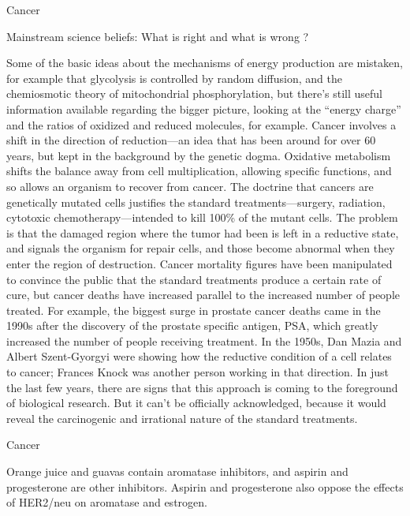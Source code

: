 \documentclass[11pt,oneside,openany,extrafontsizes]{memoir}
\begin{document}
\begin{qaexchange}{Cancer}

    \begin{question}
        Mainstream science beliefs: What is right and what is wrong ?
    \end{question}

    \begin{answer}
        Some of the basic ideas about the mechanisms of energy production are mistaken, for example that glycolysis is controlled by random diffusion, and the chemiosmotic theory of mitochondrial phosphorylation, but there's still useful information available regarding the bigger picture, looking at the \enquote{energy charge} and the ratios of oxidized and reduced molecules, for example. Cancer involves a shift in the direction of reduction---an idea that has been around for over 60 years, but kept in the background by the genetic dogma. Oxidative metabolism shifts the balance away from cell multiplication, allowing specific functions, and so allows an organism to recover from cancer. The doctrine that cancers are genetically mutated cells justifies the standard treatments---surgery, radiation, cytotoxic chemotherapy---intended to kill 100\% of the mutant cells. The problem is that the damaged region where the tumor had been is left in a reductive state, and signals the organism for repair cells, and those become abnormal when they enter the region of destruction. Cancer mortality figures have been manipulated to convince the public that the standard treatments produce a certain rate of cure, but cancer deaths have increased parallel to the increased number of people treated. For example, the biggest surge in prostate cancer deaths came in the 1990s after the discovery of the prostate specific antigen, PSA, which greatly increased the number of people receiving treatment. In the 1950s, Dan Mazia and Albert Szent-Gyorgyi were showing how the reductive condition of a cell relates to cancer; Frances Knock was another person working in that direction. In just the last few years, there are signs that this approach is coming to the foreground of biological research. But it can't be officially acknowledged, because it would reveal the carcinogenic and irrational nature of the standard treatments.
    \end{answer}
\end{qaexchange}

\begin{standalonequote}{Cancer}

    \begin{answer}
        Orange juice and guavas contain aromatase inhibitors, and aspirin and progesterone are other inhibitors. Aspirin and progesterone also oppose the effects of HER2/neu on aromatase and estrogen. 
    \end{answer}
\end{standalonequote}
\end{document}
